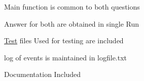 Main function is common to both questions

Answer for both are obtained in single Run

\hyperlink{class_test}{Test} files Used for testing are included

log of events is maintained in logfile.\+txt

Documentation Included 